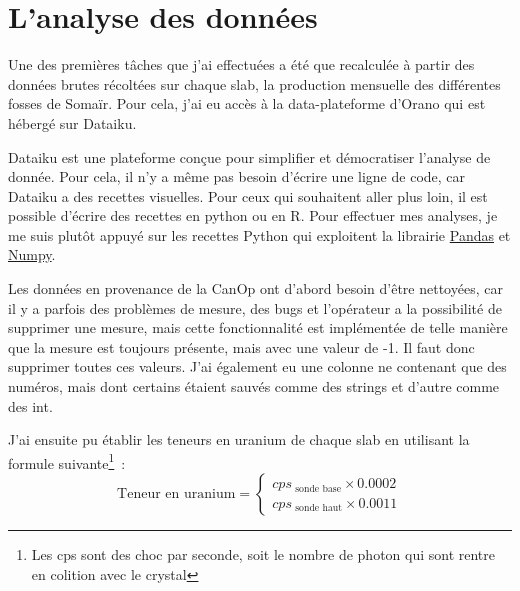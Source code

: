 
\section{L'analyse des données}
Une des premières tâches que j'ai effectuées a été que recalculée à partir des données brutes récoltées sur chaque slab, la production mensuelle des différentes fosses de Somaïr. Pour cela, j'ai eu accès  à la data-plateforme d’Orano qui est hébergé sur Dataiku. 

Dataiku est une plateforme conçue pour simplifier et démocratiser l'analyse de donnée. Pour cela, il n'y a même pas besoin d'écrire une ligne de code, car Dataiku a des recettes visuelles. Pour ceux qui souhaitent aller plus loin, il est possible d'écrire des recettes en python ou en R. Pour effectuer mes analyses, je me suis plutôt appuyé sur les recettes Python qui exploitent la librairie \href{https://pandas.pydata.org/}{Pandas} et \href{https://numpy.org/}{Numpy}.

Les données en provenance de la CanOp ont d'abord besoin d'être nettoyées, car il y a parfois des problèmes de mesure, des bugs et l'opérateur a la possibilité de supprimer une mesure, mais cette fonctionnalité est implémentée de telle manière que la mesure est toujours présente, mais avec une valeur de -1. Il faut donc supprimer toutes ces valeurs. J'ai également eu une colonne ne contenant que des numéros, mais dont certains étaient sauvés comme des strings et d'autre comme des int.

J'ai ensuite pu établir les teneurs en uranium de chaque slab en utilisant la formule suivante\footnote{Les cps sont des choc par seconde, soit le nombre de photon qui sont rentre en colition avec le crystal}~:
\[
    \text{Teneur en uranium} = 
    \begin{cases}
        cps_{\text{ sonde base}} \times 0.0002 \\
        cps_{\text{ sonde haut}} \times 0.0011
    \end{cases}
\]



